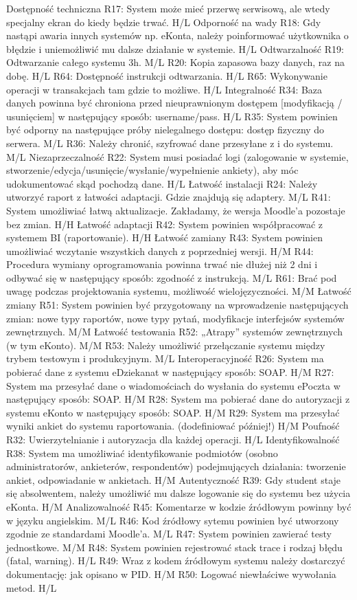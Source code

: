Dostępność techniczna
R17: System może mieć przerwę serwisową, ale wtedy specjalny ekran do kiedy będzie trwać. H/L
Odporność na wady
R18: Gdy nastąpi awaria innych systemów np. eKonta, należy poinformować użytkownika o błędzie i uniemożliwić mu dalsze działanie w systemie. H/L
Odtwarzalność
R19: Odtwarzanie całego systemu 3h. M/L
R20: Kopia zapasowa bazy danych, raz na dobę. H/L
R64: Dostępność instrukcji odtwarzania. H/L
R65: Wykonywanie operacji w transakcjach tam gdzie to możliwe. H/L
Integralność
R34: Baza danych powinna być chroniona przed nieuprawnionym dostępem [modyfikacją / usunięciem] w następujący sposób: username/pass. H/L
R35: System powinien być odporny na następujące próby nielegalnego dostępu: dostęp fizyczny do serwera. M/L
R36: Należy chronić, szyfrować dane przesyłane z i do systemu. M/L
Niezaprzeczalność
R22: System musi posiadać logi (zalogowanie w systemie, stworzenie/edycja/usunięcie/wysłanie/wypełnienie ankiety), aby móc udokumentować skąd pochodzą dane. H/L
Łatwość instalacji
R24: Należy utworzyć raport z łatwości adaptacji. Gdzie znajdują się adaptery. M/L
R41: System umożliwiać łatwą aktualizacje. Zakładamy, że wersja Moodle'a pozostaje bez zmian. H/H
Łatwość adaptacji
R42: System powinien współpracować z systemem BI (raportowanie). H/H
Łatwość zamiany
R43: System powinien umożliwiać wczytanie wszystkich danych z poprzedniej wersji. H/M
R44: Procedura wymiany oprogramowania powinna trwać nie dłużej niż 2 dni i odbywać się w następujący sposób: zgodność z instrukcją. M/L
R61: Brać pod uwagę podczas projektowania systemu, możliwość wielojęzyczności. M/M
Łatwość zmiany
R51: System powinien być przygotowany na wprowadzenie następujących zmian: nowe typy raportów, nowe typy pytań, modyfikacje interfejsów systemów zewnętrznych. M/M
Łatwość testowania
R52: „Atrapy” systemów zewnętrznych (w tym eKonto). M/M
R53: Należy umożliwić przełączanie systemu między trybem testowym i produkcyjnym. M/L
Interoperacyjność
R26: System ma pobierać dane z systemu eDziekanat w następujący sposób: SOAP. H/M
R27: System ma przesyłać dane o wiadomościach do wysłania do systemu ePoczta w następujący sposób: SOAP. H/M
R28: System ma pobierać dane do autoryzacji z systemu eKonto w następujący sposób: SOAP. H/M
R29: System ma przesyłać wyniki ankiet do systemu raportowania. (dodefiniować później!) H/M
Poufność
R32: Uwierzytelnianie i autoryzacja dla każdej operacji. H/L
Identyfikowalność
R38: System ma umożliwiać identyfikowanie podmiotów (osobno administratorów, ankieterów, respondentów) podejmujących działania: tworzenie ankiet, odpowiadanie w 
ankietach. H/M
Autentyczność
R39: Gdy student staje się absolwentem, należy umożliwić mu dalsze logowanie się do systemu bez użycia eKonta. H/M
Analizowalność
R45: Komentarze w kodzie źródłowym powinny być w języku angielskim. M/L
R46: Kod źródłowy sytemu powinien być utworzony zgodnie ze standardami Moodle'a. M/L
R47: System powinien zawierać testy jednostkowe. M/M
R48: System powinien rejestrować stack trace i rodzaj błędu (fatal, warning). H/L
R49: Wraz z kodem źródłowym systemu należy dostarczyć dokumentację: jak opisano w PID. H/M
R50: Logować niewłaściwe wywołania metod. H/L

